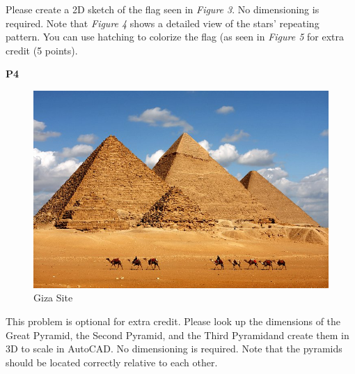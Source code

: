 \documentclass{article}
\begin{document}
\vspace{6mm} \noindent Please create a 2D sketch of the flag seen in \textit{Figure 3}. No dimensioning is required. Note that \textit{Figure 4} shows a detailed view of the stars’ repeating pattern. You can use hatching to colorize the flag (as seen in \textit{Figure 5} for extra credit (5 points).

\textbf{P4}
\begin{figure}[H]
  \centering
  \includegraphics[width=.725\linewidth]{images/4.jpg}  
  \caption{Giza Site}
  \label{fig:6}
\end{figure}
\noindent This problem is optional for extra credit. Please look up the dimensions of the Great Pyramid, the Second Pyramid, and the Third Pyramidand create them in 3D to scale in AutoCAD. No dimensioning is required. Note that the pyramids should be located correctly relative to each other.
\end{document}
